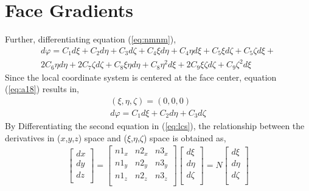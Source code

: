 \section{Face Gradients}
\hspace{0.25cm}Further, differentiating equation (\ref{eq:nmnm}),
\begin{equation}
\label{eq:a18}
\begin{gathered}
    {d\varphi}=C_1d\xi+C_2d\eta+C_3d\zeta+C_4\xi d\eta+C_4\eta d\xi+C_5 \xi d\zeta+C_5 \zeta d\xi+\\
    2C_6\eta d\eta+2C_7\zeta d\zeta+C_8 \xi \eta d\eta+C_8 \eta^2 d\xi+2C_9\xi\zeta d\zeta+C_9\zeta^2 d\xi
\end{gathered}
\end{equation}
Since the local coordinate system is centered at the face center, equation (\ref{eq:a18}) results in,
\begin{equation}
    \label{eq:a19}
    \begin{gathered}
    (\xi,\eta,\zeta)=(0,0,0)\\
    {d\varphi}=C_1d\xi+C_2d\eta+C_3d\zeta
    \end{gathered}
\end{equation}
By Differentiating the second equation in (\ref{eq:lcs}), the relationship between the derivatives in ($x$,$y$,$z$) space and ($\xi$,$\eta$,$\zeta$) space is obtained as,
\begin{equation}
    \label{eq:a20}
    \begin{gathered}
    \begin{bmatrix}
    dx\\
    dy\\
    dz\\
    \end{bmatrix}=\begin{bmatrix}
    n1_x&n2_x&n3_x\\
    n1_y&n2_y&n3_y\\
    n1_z&n2_z&n3_z\\
    \end{bmatrix} \begin{bmatrix}
    d\xi\\
    d\eta\\
    d\zeta\\
    \end{bmatrix}=N \begin{bmatrix}
     d\xi\\
    d\eta\\
    d\zeta\\
    \end{bmatrix}
    \end{gathered} 
\end{equation}
